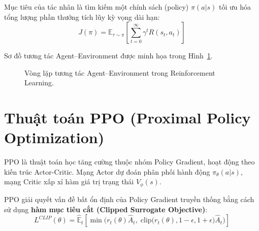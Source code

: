\documentclass[a4paper, 12pt]{report}
\begin{document}
  Mục tiêu của tác nhân là tìm kiếm một chính sách (policy) $\pi(a|s)$ tối ưu hóa tổng lượng phần thưởng tích lũy kỳ vọng dài hạn:
  \begin{equation}
    J(\pi) = \mathbb{E}_{\tau \sim \pi}\left[\sum_{t=0}^{\infty}\gamma^t R(s_t, a_t)\right]
  \end{equation}

  Sơ đồ tương tác Agent--Environment được minh họa trong Hình~\ref{fig:rl_loop}.

  \begin{figure}[H]
    \centering
    \caption{Vòng lặp tương tác Agent--Environment trong Reinforcement Learning.}
    \label{fig:rl_loop}
  \end{figure}

  \section{Thuật toán PPO (Proximal Policy Optimization)}

  PPO là thuật toán học tăng cường thuộc nhóm Policy Gradient, hoạt động theo kiến trúc Actor-Critic. Mạng Actor dự đoán phân phối hành động $\pi_\theta(a|s)$, mạng Critic xấp xỉ hàm giá trị trạng thái $V_\phi(s)$.

  PPO giải quyết vấn đề bất ổn định của Policy Gradient truyền thống bằng cách sử dụng \textbf{hàm mục tiêu cắt (Clipped Surrogate Objective)}:
  \begin{equation}
    L^{CLIP}(\theta) = \hat{\mathbb{E}}_t\left[\min\Big(r_t(\theta)\hat{A}_t, \;\text{clip}\big(r_t(\theta), 1-\epsilon, 1+\epsilon\big)\hat{A}_t\Big)\right]
    \label{eq:ppo_clip}
  \end{equation}
\end{document}
